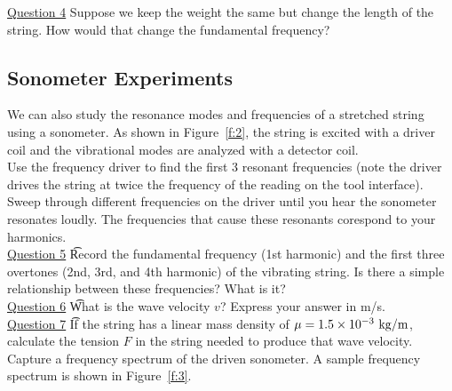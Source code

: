 \documentclass[11pt]{NSF}
\begin{document}
\underline{Question 4} Suppose we keep the weight the same but change
the length of the string.
How would that change the fundamental frequency?

\subsection{Sonometer Experiments}

We can also study the resonance modes and frequencies of a 
stretched string using a sonometer.
As shown in Figure~\ref{f:2}, 
the string is excited with a driver coil 
and the vibrational modes are analyzed with a detector coil. \\

Use the frequency driver to find the first 3 resonant frequencies (note the driver drives the string at twice the frequency of the reading on the tool interface). Sweep through different frequencies on the driver until you hear the sonometer resonates loudly. The frequencies that cause these resonants corespond to your harmonics. \\

\underline{Question 5} \t Record the fundamental frequency (1st harmonic)
and the first three overtones (2nd, 3rd, and 4th harmonic) of the vibrating
string.
Is there a simple relationship between these frequencies? What is it? \\

\underline{Question 6} \t  What is the wave velocity $v$?
Express your answer in m/s. \\

\underline{Question 7} \t  If the string has a linear mass density of $\mu = 1.5\times 10^{-3}~{\rm kg/m}$,
calculate the tension $F$ in the string needed to 
produce that wave velocity. \\

Capture a frequency spectrum of the driven sonometer.
A sample frequency spectrum is shown in Figure~\ref{f:3}.
\end{document}
